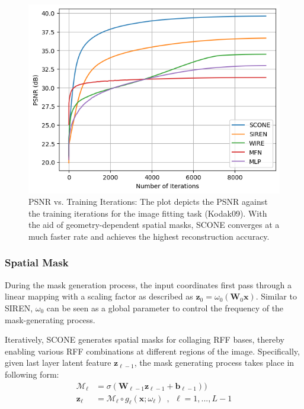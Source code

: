 \documentclass[letterpaper]{article} %
\newcommand{\mat}[1]{\bm{#1}}
\begin{document}
\begin{figure}[ht]
    \centering
    \includegraphics[width=0.9\columnwidth]{Figures/psnr_vs_iters.png}  
    \caption{PSNR vs. Training Iterations: The plot depicts the PSNR against the training iterations for the image fitting task (Kodak09). With the aid of geometry-dependent spatial masks, SCONE converges at a much faster rate and achieves the highest reconstruction accuracy.}
    \label{fig:psnr_vs_iters}
\end{figure}

\subsubsection{Spatial Mask}
\label{subsubsec:method_mask}


During the mask generation process, the input coordinates first pass through a linear mapping with a scaling factor as described as $\mathbf{z}_{0} = \omega_0 (\mat{W}_{0}\mathbf{x})$. Similar to SIREN, $\omega_0$ can be seen as a global parameter to control the frequency of the mask-generating process.

Iteratively, SCONE generates spatial masks for collaging RFF bases, thereby enabling various RFF combinations at different regions of the image. Specifically, given last layer latent feature $\mathbf{z}_{\ell-1}$, the mask generating process takes place in following form:
\begin{equation}
    \begin{aligned}
         \mathcal{M}_{\ell} &=\sigma(\mat{W}_{\ell-1}\mathbf{z}_{\ell-1} + \mathbf{b}_{\ell-1})) \\
         \mathbf{z}_{\ell} &=  \mathcal{M}_{\ell} \circ g_{\ell}(\mathbf{x};\omega_{\ell})    \ \ , \ \ \ell = 1, ... , L-1 \\
    \end{aligned}%
\end{equation}%
\end{document}

